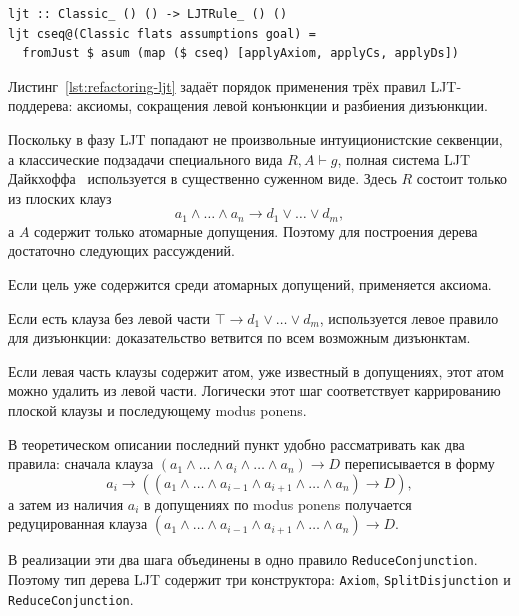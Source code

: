 \documentclass[14pt, russian]{scrartcl}
\begin{document}
\begin{listing}[!htb]
\caption{Функция построения LJT-доказательства \texttt{ljt}}
\label{lst:refactoring-ljt}
\begin{verbatim}
ljt :: Classic_ () () -> LJTRule_ () ()
ljt cseq@(Classic flats assumptions goal) =
  fromJust $ asum (map ($ cseq) [applyAxiom, applyCs, applyDs])
\end{verbatim}
\end{listing}

Листинг~\ref{lst:refactoring-ljt} задаёт порядок применения трёх правил
LJT-поддерева: аксиомы, сокращения левой конъюнкции и разбиения дизъюнкции.

Поскольку в фазу LJT попадают не произвольные интуиционистские секвенции, а
классические подзадачи специального вида $R, A \vdash g$, полная система LJT
Дайкхоффа~\cite{Dyckhoff1992} используется в существенно суженном виде. Здесь
$R$ состоит только из плоских клауз
\[
a_1 \land \ldots \land a_n \rightarrow d_1 \lor \ldots \lor d_m,
\]
а $A$ содержит только атомарные допущения. Поэтому для построения дерева
достаточно следующих рассуждений.

Если цель уже содержится среди атомарных допущений, применяется аксиома.

Если есть клауза без левой части $\top \rightarrow d_1 \lor \ldots \lor d_m$,
  используется левое правило для дизъюнкции: доказательство ветвится по всем
  возможным дизъюнктам.

Если левая часть клаузы содержит атом, уже известный в допущениях, этот
  атом можно удалить из левой части. Логически этот шаг соответствует
  каррированию плоской клаузы и последующему modus ponens.

В теоретическом описании последний пункт удобно рассматривать как два правила:
сначала клауза
\(
(a_1 \land \ldots \land a_i \land \ldots \land a_n) \rightarrow D
\)
переписывается в форму
\[
a_i \rightarrow ((a_1 \land \ldots \land a_{i-1} \land a_{i+1}
\land \ldots \land a_n) \rightarrow D),
\]
а затем из наличия $a_i$ в допущениях по modus ponens получается редуцированная
клауза
\(
(a_1 \land \ldots \land a_{i-1} \land a_{i+1}
\land \ldots \land a_n) \rightarrow D.
\)

В реализации эти два шага объединены в одно правило
\texttt{ReduceConjunction}. Поэтому тип дерева LJT содержит три конструктора:
\texttt{Axiom}, \texttt{SplitDisjunction} и \texttt{ReduceConjunction}.
\end{document}
